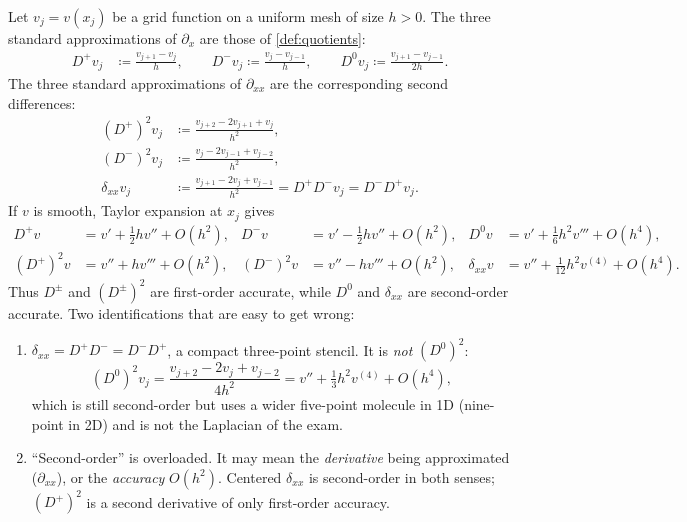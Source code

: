 \documentclass[11pt,a4paper]{article}
\begin{document}
\begin{definition}
\label{def:quotients-1d}
Let \(v_j=v(x_j)\) be a grid function on a uniform mesh of size \(h>0\). The three standard approximations of \(\partial_x\) are those of \cref{def:quotients}:
\begin{align*}
D^+v_j
&\coloneqq
\frac{v_{j+1}-v_j}{h},
\qquad
D^-v_j
\coloneqq
\frac{v_j-v_{j-1}}{h},
\qquad
D^0v_j
\coloneqq
\frac{v_{j+1}-v_{j-1}}{2h}.
\end{align*}
The three standard approximations of \(\partial_{xx}\) are the corresponding second differences:
\begin{align*}
(D^+)^2 v_j
&\coloneqq
\frac{v_{j+2}-2v_{j+1}+v_j}{h^2},
\\
(D^-)^2 v_j
&\coloneqq
\frac{v_j-2v_{j-1}+v_{j-2}}{h^2},
\\
\delta_{xx}v_j
&\coloneqq
\frac{v_{j+1}-2v_j+v_{j-1}}{h^2}
=
D^+D^-v_j
=
D^-D^+v_j.
\end{align*}
If \(v\) is smooth, Taylor expansion at \(x_j\) gives
\begin{align*}
D^+v
&=
v'+\tfrac12 h v''+O(h^2),
&
D^-v
&=
v'-\tfrac12 h v''+O(h^2),
&
D^0v
&=
v'+\tfrac16 h^2 v'''+O(h^4),
\\
(D^+)^2 v
&=
v''+h v'''+O(h^2),
&
(D^-)^2 v
&=
v''-h v'''+O(h^2),
&
\delta_{xx}v
&=
v''+\tfrac{1}{12}h^2 v^{(4)}+O(h^4).
\end{align*}
Thus \(D^\pm\) and \((D^\pm)^2\) are first-order accurate, while \(D^0\) and \(\delta_{xx}\) are second-order accurate. Two identifications that are easy to get wrong:
\begin{enumerate}[label=\textup{(\roman*)}]
    \item \(\delta_{xx}=D^+D^-=D^-D^+\), a compact three-point stencil. It is \emph{not} \((D^0)^2\):
    \[
    (D^0)^2 v_j
    =
    \frac{v_{j+2}-2v_j+v_{j-2}}{4h^2}
    =
    v''+\tfrac13 h^2 v^{(4)}+O(h^4),
    \]
    which is still second-order but uses a wider five-point molecule in 1D (nine-point in 2D) and is not the Laplacian of the exam.
    \item ``Second-order'' is overloaded. It may mean the \emph{derivative} being approximated (\(\partial_{xx}\)), or the \emph{accuracy} \(O(h^2)\). Centered \(\delta_{xx}\) is second-order in both senses; \((D^+)^2\) is a second derivative of only first-order accuracy.
\end{enumerate}
\end{definition}
\end{document}
